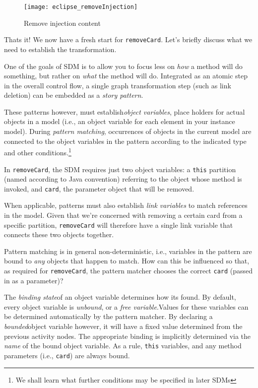 \newpage

\begin{figure}[htbp]
	\centering
    \texttt{[image: eclipse\_removeInjection]}
	\caption{Remove injection content}
	\label{fig:delete_injection}
\end{figure}

\vspace{1cm}

Thats it! We now have a fresh start for \texttt{removeCard}. Let's briefly discuss what we need to establish the transformation.

One of the goals of SDM is to allow you to focus less on \emph{how} a method will do something, but rather on \emph{what} the method will do.
Integrated as an atomic step in the overall control flow, a single graph transformation step (such as link deletion) can be embedded as a
\emph{story pattern}.

These patterns however, must establish\emph{object variables}, place holders for actual objects in a model (i.e., an object
variable for each element in your instance model). During \emph{pattern matching}, occurrences of objects in the current model are connected to the object
variables in the pattern according to the indicated type and other conditions.\footnote{We shall learn what further conditions may be specified in later SDMs}

\clearpage

In \texttt{removeCard}, the SDM requires just two object variables: a \texttt{this} partition (named according to Java convention) referring to the
object whose method is invoked, and \texttt{card}, the parameter object that will be removed.

When applicable, patterns must also establish \emph{link variables} to match references in the model. Given that
we're concerned with removing a certain card from a specific partition, \texttt{removeCard} will therefore have a single link variable that connects these two
objects together.

Pattern matching is in general non-deterministic, i.e., variables in the pattern are bound to \emph{any} objects that happen to match. How can this be
influenced so that, as required for \texttt{removeCard}, the pattern matcher chooses the correct \texttt{card} (passed in as a parameter)?

The \emph{binding state}of an object variable determines how its found. By default, every object variable is \emph{unbound}, or a 
\emph{free variable}.Values for these variables can be determined automatically by the pattern matcher. By declaring a
\emph{bounded}object variable however, it will have a fixed value determined from the previous activity nodes.
The appropriate binding is implicitly determined via the \emph{name} of the bound object variable. As a rule, \texttt{this} variables, and any method parameters
(i.e., \texttt{card}) are always bound.

